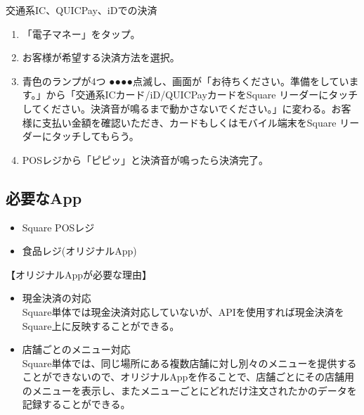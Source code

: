 \documentclass[dvipdfmx,jb5]{jarticle}
\begin{document}
\begin{itemize}
  交通系IC、QUICPay、iDでの決済
  \begin{enumerate}[手順1]
   \item 「電子マネー」をタップ。
   \item お客様が希望する決済方法を選択。
   \item 青色のランプが4つ{\color{blue} ●●●●}点滅し、画面が「お待ちください。準備をしています。」から「交通系ICカード/iD/QUICPayカードをSquare リーダーにタッチしてください。決済音が鳴るまで動かさないでください。」に変わる。お客様に支払い金額を確認いただき、カードもしくはモバイル端末をSquare リーダーにタッチしてもらう。
   \item POSレジから「ピピッ」と決済音が鳴ったら決済完了。
  \end{enumerate}
 \end{itemize}
 \subsection{必要なApp}
 \begin{itemize}
 \item Square POSレジ
 \item 食品レジ(オリジナルApp)
 \end{itemize}
 \begin{itembox}[l]{【オリジナルAppが必要な理由】}
  \begin{itemize}
   \item 現金決済の対応\\
   Square単体では現金決済対応していないが、APIを使用すれば現金決済をSquare上に反映することができる。
   \item 店舗ごとのメニュー対応\\
   Square単体では、同じ場所にある複数店舗に対し別々のメニューを提供することができないので、オリジナルAppを作ることで、店舗ごとにその店舗用のメニューを表示し、またメニューごとにどれだけ注文されたかのデータを記録することができる。
  \end{itemize}
 \end{itembox}
\end{document}
